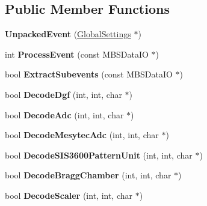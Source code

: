 \subsection*{Public Member Functions}
\begin{DoxyCompactItemize}
\item 
\mbox{\label{class_unpacked_event_a399f80fef86fdaf260c67d0868e39006}} 
{\bfseries Unpacked\+Event} (\hyperlink{class_global_settings}{Global\+Settings} $\ast$)
\item 
\mbox{\label{class_unpacked_event_a719e676645566cd033f53ad047fea2e8}} 
int {\bfseries Process\+Event} (const M\+B\+S\+Data\+IO $\ast$)
\item 
\mbox{\label{class_unpacked_event_a654a1c6f241b56cf4e3cb18606e98101}} 
bool {\bfseries Extract\+Subevents} (const M\+B\+S\+Data\+IO $\ast$)
\item 
\mbox{\label{class_unpacked_event_a1473955edd8aced26b25f4aa4ea1cc99}} 
bool {\bfseries Decode\+Dgf} (int, int, char $\ast$)
\item 
\mbox{\label{class_unpacked_event_a5d1e95803242426e747e325bf5f41882}} 
bool {\bfseries Decode\+Adc} (int, int, char $\ast$)
\item 
\mbox{\label{class_unpacked_event_a8622b91904185be6dbca1b27d629d3b3}} 
bool {\bfseries Decode\+Mesytec\+Adc} (int, int, char $\ast$)
\item 
\mbox{\label{class_unpacked_event_aace1ccd22e30b9b188b06db28e406ef2}} 
bool {\bfseries Decode\+S\+I\+S3600\+Pattern\+Unit} (int, int, char $\ast$)
\item 
\mbox{\label{class_unpacked_event_adbce67a2bb15ce234e133ce686324762}} 
bool {\bfseries Decode\+Bragg\+Chamber} (int, int, char $\ast$)
\item 
\mbox{\label{class_unpacked_event_a9b1491e6809f949d582348f4855671a9}} 
bool {\bfseries Decode\+Scaler} (int, int, char $\ast$)
\item 
\mbox{\label{class_unpacked_event_a7a965ea80344bfb2957dc68495085bd4}} 

\end{DoxyCompactItemize}
